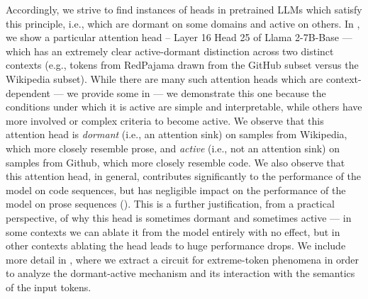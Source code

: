Accordingly, we strive to find instances of heads in pretrained LLMs which satisfy this principle, i.e., which are dormant on some domains and active on others. In , we show a particular attention head -- Layer 16 Head 25 of Llama 2-7B-Base \citep{touvron2023llama} --- which has an extremely clear active-dormant distinction across two distinct contexts (e.g., tokens from RedPajama \citep{together2023redpajama} drawn from the GitHub subset versus the Wikipedia subset). While there are many such attention heads which are context-dependent --- we provide some in  --- we demonstrate this one because the conditions under which it is active are simple and interpretable, while others have more involved or complex criteria to become active. We observe that this attention head is \textit{dormant} (i.e., an attention sink) on samples from Wikipedia, which more closely resemble prose, and \textit{active} (i.e., not an attention sink) on samples from Github, which more closely resemble code. We also observe that this attention head, in general, contributes significantly to the performance of the model on code sequences, but has negligible impact on the performance of the model on prose sequences (). This is a further justification, from a practical perspective, of why this head is sometimes dormant and sometimes active --- in some contexts we can ablate it from the model entirely with no effect, but in other contexts ablating the head leads to huge performance drops. %
We include more detail in , where we extract a circuit for extreme-token phenomena in order to analyze the dormant-active mechanism and its interaction with the semantics of the input tokens.

